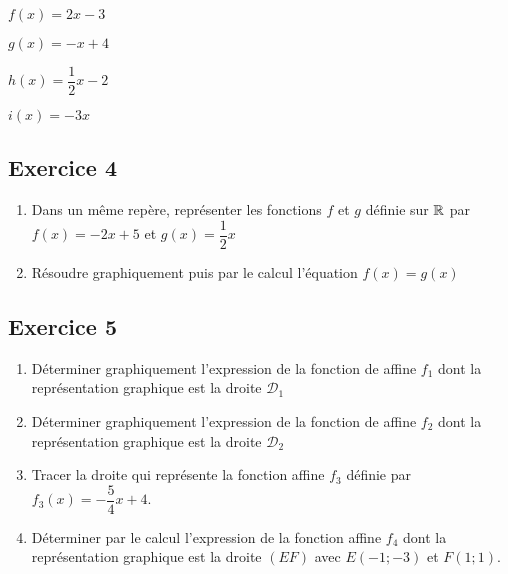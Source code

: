 \documentclass[12pt,a4paper]{article}
\begin{document}
\begin{enumerate}
\begin{minipage}[c]{0.3\linewidth}
\item $f(x)=2x-3$
\end{minipage}
\begin{minipage}[c]{0.3\linewidth}
\item $g(x)=-x+4$
\end{minipage}
\begin{minipage}[c]{0.3\linewidth}
\item $h(x)=\dfrac{1}{2}x-2$
\end{minipage}
\begin{minipage}[c]{0.3\linewidth}
\item $i(x)=-3x$

\end{minipage}
\end{enumerate}


\subsection*{Exercice 4}

\begin{enumerate}
    \item Dans un même repère, représenter les fonctions $f$ et $g$ définie sur $\mathbb{R}$ par $f(x)=-2x+5$ et $g(x)=\dfrac{1}{2}x$
    \item Résoudre graphiquement puis par le calcul l'équation $f(x)=g(x)$
\end{enumerate}

\subsection*{Exercice 5}

\begin{enumerate}
    \item Déterminer graphiquement l'expression de la fonction de affine $f_1$ dont la représentation graphique est la droite $\mathscr{D}{_1}$
    \item Déterminer graphiquement l'expression de la fonction de affine $f_2$ dont la représentation graphique est la droite $\mathscr{D}{_2}$
    \item Tracer la droite qui représente la fonction affine $f_3$ définie par $f_3(x)=-\dfrac{5}{4}x+4$.
    \item Déterminer par le calcul l'expression de la fonction affine $f_4$ dont la représentation graphique est la droite $(EF)$ avec $E(-1;-3)$ et $F(1;1)$.
\end{enumerate}
\end{document}
